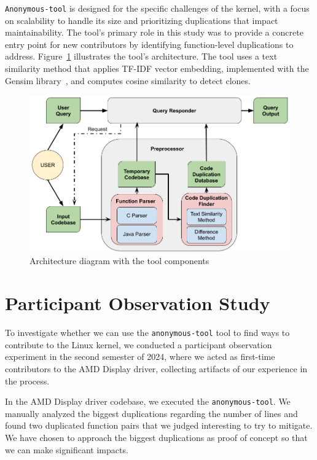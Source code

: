 \documentclass[12pt]{article}
\begin{document}
\texttt{Anonymous-tool} is designed for the specific challenges of the kernel, with a focus on scalability to handle its size and prioritizing duplications that impact maintainability. The tool's primary role in this study was to provide a concrete entry point for new contributors by identifying function-level duplications to address. Figure~\ref{fig:diagrama} illustrates the tool's architecture. The tool uses a text similarity method that applies TF-IDF vector embedding, implemented with the Gensim library~\cite{gensim}, and computes cosine similarity to detect clones.

\begin{figure}[ht]
\centering
\includegraphics[scale=0.33]{diagrama_mestrado}
\caption{Architecture diagram with the tool components
}
\label{fig:diagrama}
\end{figure}

\section{Participant Observation Study}
\label{sec:participant}

To investigate whether we can use the \texttt{anonymous-tool} tool to find ways to contribute to the Linux kernel, we conducted a participant observation experiment in the second semester of 2024, where we acted as first-time contributors to the AMD Display driver, collecting artifacts of our experience in the process.

In the AMD Display driver codebase, we executed the \texttt{anonymous-tool}. We manually analyzed the biggest duplications regarding the number of lines and found two duplicated function pairs that we judged interesting to try to mitigate. We have chosen to approach the biggest duplications as proof of concept so that we can make significant impacts. 
\end{document}
